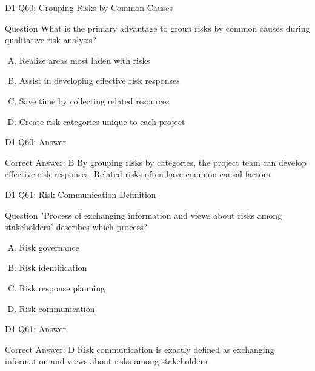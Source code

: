 \documentclass{beamer}
\begin{document}
	\begin{frame}{D1-Q60: Grouping Risks by Common Causes}
		\begin{block}{Question}
			What is the primary advantage to group risks by common causes during qualitative risk analysis?
		\end{block}
		\begin{enumerate}[(A)]
			\item Realize areas most laden with risks
			\item Assist in developing effective risk responses
			\item Save time by collecting related resources
			\item Create risk categories unique to each project
		\end{enumerate}
	\end{frame}
	\begin{frame}{D1-Q60: Answer}
		\begin{block}{Correct Answer: B}
			By grouping risks by categories, the project team can develop effective risk responses. Related risks often have common causal factors.
		\end{block}
	\end{frame}
	
	\begin{frame}{D1-Q61: Risk Communication Definition}
		\begin{block}{Question}
			"Process of exchanging information and views about risks among stakeholders" describes which process?
		\end{block}
		\begin{enumerate}[(A)]
			\item Risk governance
			\item Risk identification
			\item Risk response planning
			\item Risk communication
		\end{enumerate}
	\end{frame}
	\begin{frame}{D1-Q61: Answer}
		\begin{block}{Correct Answer: D}
			Risk communication is exactly defined as exchanging information and views about risks among stakeholders.
		\end{block}
	\end{frame}
	
\end{document}
